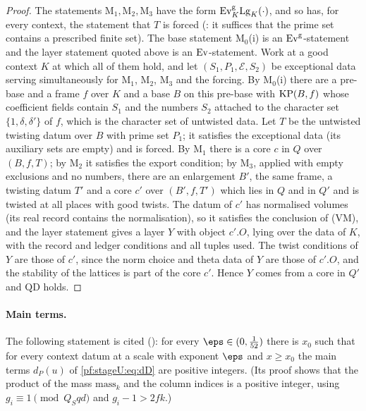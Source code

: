 \begin{proof}
The statements $\mathrm{M}_1,\mathrm{M}_2,\mathrm{M}_3$ have the form $\mathrm{Ev}^{\mathrm g}_K\mathrm{Lg}_K(\cdot)$, and so has, for
every context, the statement that $T$ is forced (: it suffices
that the prime set contains a prescribed finite set). The base statement $\mathrm{M}_0$(i) is an
$\mathrm{Ev}^{\mathrm g}$-statement and the layer statement quoted above is an $\mathrm{Ev}$-statement. Work at a good context
$K$ at which all of them hold, and let $(S_1,P_1,\mathcal E,S_2)$ be exceptional data serving simultaneously for
$\mathrm{M}_1$, $\mathrm{M}_2$, $\mathrm{M}_3$ and the forcing. By $\mathrm{M}_0$(i) there are a pre-base and a frame $f$ over $K$
and a base $B$ on this pre-base with $\mathrm{KP}(B,f)$ whose coefficient fields contain $S_1$ and the numbers $S_2$ attached
to the character set $\{1,\delta,\delta'\}$ of $f$, which is the character set of untwisted data. Let $T$ be the
untwisted twisting datum over $B$ with prime set $P_1$; it satisfies the exceptional data (its auxiliary sets are empty)
and is forced. By $\mathrm{M}_1$ there is a core $c$ in $Q$ over $(B,f,T)$; by $\mathrm{M}_2$ it satisfies the export
condition; by $\mathrm{M}_3$, applied with empty exclusions and no numbers, there are an enlargement $B'$, the same frame,
a twisting datum $T'$ and a core $c'$ over $(B',f,T')$ which lies in $Q$ and in $Q'$ and is twisted at all places with good
twists. The datum of $c'$ has normalised volumes (its real record contains the normalisation), so it satisfies the
conclusion of (VM), and the layer statement gives a layer $Y$ with object $c'.O$, lying over the data of $K$, with the
record and ledger conditions and all tuples used. The twist conditions of $Y$ are those of $c'$, since the norm choice
and theta data of $Y$ are those of $c'.O$, and the stability of the lattices is part of the core $c'$. Hence $Y$ comes
from a core in $Q'$ and $\mathrm{QD}$ holds.
\end{proof}

\paragraph{Main terms.} The following statement is cited (): for every
$\eps\in(0,\frac1{52})$ there is $x_0$ such that for every context datum at a scale with exponent $\eps$ and $x\ge x_0$ the
main terms $d_P(u)$ of \eqref{pf:stageU:eq:dD} are positive integers. (Its proof shows that the product of the mass
$\mathrm{mass}_k$ and the column indices is a positive integer, using $g_i\equiv1\pmod{Q_Sqd}$ and $g_i-1>2fk$.)

